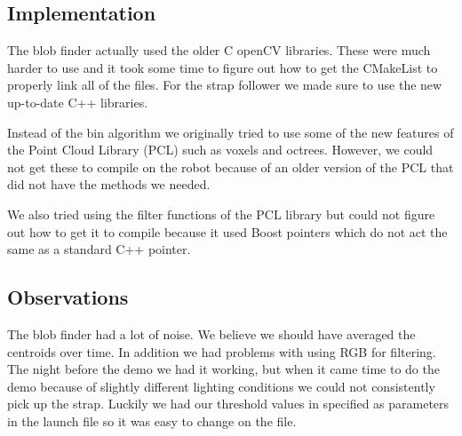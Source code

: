 \subsection{Implementation}
The blob finder actually used the older C openCV libraries. These were much harder to use and it took some time to figure out how to get the CMakeList to properly link all of the files. For the strap follower we made sure to use the new up-to-date C++ libraries.

Instead of the bin algorithm we originally tried to use some of the new features of the Point Cloud Library (PCL) such as voxels and octrees.  However, we could not get these to compile on the robot because of an older version of the PCL that did not have the methods we needed.

We also tried using the filter functions of the PCL library but could not figure out how to get it to compile because it used Boost pointers which do not act the same as a standard C++ pointer.

\subsection{Observations}

The blob finder had a lot of noise. We believe we should have averaged the centroids over time. In addition we had problems with using RGB for filtering. The night before the demo we had it working, but when it came time to do the demo because of slightly different lighting conditions we could not consistently pick up the strap. Luckily we had our threshold values in specified as parameters in the launch file so it was easy to change on the file.


